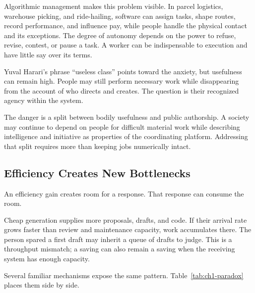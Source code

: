 Algorithmic management makes this problem visible. In parcel logistics, warehouse picking, and ride-hailing, software can assign tasks, shape routes, record performance, and influence pay, while people handle the physical contact and its exceptions. The degree of autonomy depends on the power to refuse, revise, contest, or pause a task. A worker can be indispensable to execution and have little say over its terms.

Yuval Harari's phrase “useless class” points toward the anxiety, but usefulness can remain high. People may still perform necessary work while disappearing from the account of who directs and creates. The question is their recognized agency within the system.

The danger is a split between bodily usefulness and public authorship. A society may continue to depend on people for difficult material work while describing intelligence and initiative as properties of the coordinating platform. Addressing that split requires more than keeping jobs numerically intact.

\subsection{Efficiency Creates New Bottlenecks}

An efficiency gain creates room for a response. That response can consume the room.

Cheap generation supplies more proposals, drafts, and code. If their arrival rate grows faster than review and maintenance capacity, work accumulates there. The person spared a first draft may inherit a queue of drafts to judge. This is a throughput mismatch; a saving can also remain a saving when the receiving system has enough capacity.



Several familiar mechanisms expose the same pattern. Table~\ref{tab:ch1-paradox} places them side by side.


